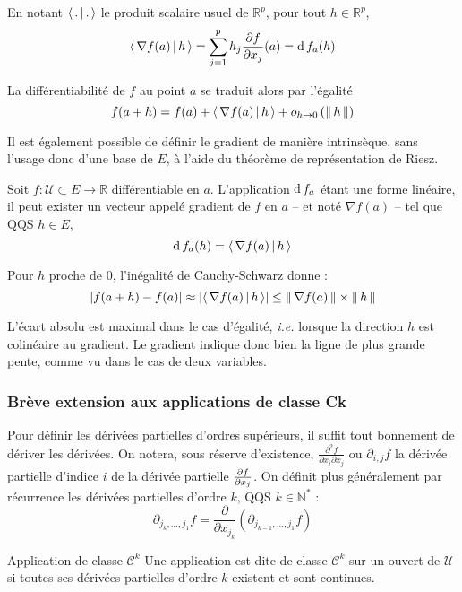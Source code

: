     En notant $\left<\,.\,\middle|\,.\,\right>$ le produit scalaire usuel de $\mathbb{R}^p$, pour tout $h \in \mathbb{R}^p$, 
    \[ \left<\,\nabla f(a)\,\middle|\,h\,\right> = \sum_{j=1}^{p} h_j \frac{\partial f}{\partial x_j}(a) = \operatorname{d} f_a(h) \] 

    La différentiabilité de $f$ au point $a$ se traduit alors par l’égalité 
    \[ f(a+h) = f(a) + \left<\,\nabla f(a)\,\middle|\,h\,\right> + o_{h \rightarrow 0} \left(\left\lVert\,h\,\right\rVert\right) \]   

    Il est également possible de définir le gradient de manière intrinsèque, sans l’usage donc d’une base de $E$, à l’aide du théorème de représentation de Riesz.

    \begin{defi}{}{}
        Soit $f : \mathcal{U} \subset E \to \mathbb{R}$ différentiable en $a$. L’application $\operatorname{d} f_a$ étant une forme linéaire, il peut exister un vecteur appelé gradient de $f$ en $a$ -- et noté $\nabla f(a)$ -- tel que QQS $h \in E$, 
        \[ \operatorname{d} f_a(h) = \left<\,\nabla f (a)\,\middle|\,h\,\right> \]   
    \end{defi}

    Pour $h$ proche de $0$, l’inégalité de Cauchy-Schwarz donne :
    \[ \left\lvert f(a+h) - f(a)\right\rvert \approx \left\lvert \left<\,\nabla f(a)\,\middle|\,h\,\right>\right\rvert \leq \left\lVert\,\nabla f(a)\,\right\rVert \times \left\lVert\,h\,\right\rVert \]   
    
    L’écart absolu est maximal dans le cas d’égalité, \textit{i.e.} lorsque la direction $h$ est colinéaire au gradient. Le gradient indique donc bien la ligne de plus grande pente, comme vu dans le cas de deux variables.

    \subsubsection{Brève extension aux applications de classe Ck}

    Pour définir les dérivées partielles d’ordres supérieurs, il suffit tout bonnement de dériver les dérivées. On notera, sous réserve d’existence, $\frac{\partial^2 f}{\partial x_i \partial x_j}$ ou $\partial_{i,j} f$ la dérivée partielle d’indice $i$ de la dérivée partielle $\frac{\partial f}{\partial x_j}$. On définit plus généralement par récurrence les dérivées partielles d’ordre $k$, QQS $k \in \mathbb{N}^*$ :
    \[ \partial_{j_k, \ldots, j_1} f = \frac{\partial}{\partial x_{j_k}} \left( \partial_{j_{k-1}, \ldots, j_1} f \right) \]   

    \begin{defi}{Application de classe $\mathcal{C}^k$}{}
        Une application est dite de classe $\mathcal{C}^k$ sur un ouvert de $\mathcal{U}$ si toutes ses dérivées partielles d’ordre $k$ existent et sont continues. 
    \end{defi}

